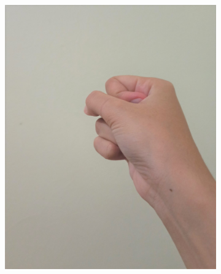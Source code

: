 \documentclass[conference]{IEEEtran}
\begin{document}
\begin{figure} [h]
\begin{center}
			\begin{subfigure}[t]{0.11\textwidth}
				\includegraphics[width=\textwidth]{img/pola1b.jpg}
				\caption{\label{fig:gs1b}}
			\end{subfigure}
			\hspace{0.1em}
			\begin{subfigure}[t]{0.11\textwidth}

\end{subfigure}
\end{center}
\end{figure}
\end{document}
